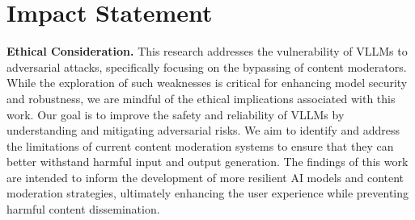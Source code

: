 \section*{Impact Statement}
\noindent \textbf{Ethical Consideration.} This research addresses the vulnerability of VLLMs to adversarial attacks, specifically focusing on the bypassing of content moderators. While the exploration of such weaknesses is critical for enhancing model security and robustness, we are mindful of the ethical implications associated with this work. Our goal is to improve the safety and reliability of VLLMs by understanding and mitigating adversarial risks.
We aim to identify and address the limitations of current content moderation systems to ensure that they can better withstand harmful input and output generation. The findings of this work are intended to inform the development of more resilient AI models and content moderation strategies, ultimately enhancing the user experience while preventing harmful content dissemination. 